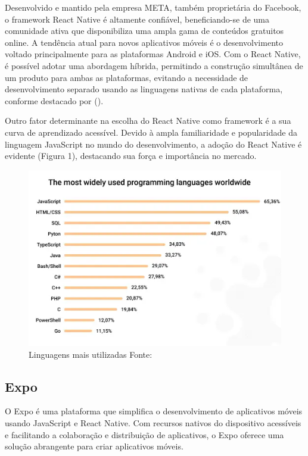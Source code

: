 Desenvolvido e mantido pela empresa META, também proprietária do Facebook, o framework React Native é altamente confiável, beneficiando-se de uma comunidade ativa 
que disponibiliza uma ampla gama de conteúdos gratuitos online. A tendência atual para novos aplicativos móveis é o desenvolvimento voltado principalmente para as 
plataformas Android e iOS. Com o React Native, é possível adotar uma abordagem híbrida, permitindo a construção simultânea de um produto para ambas as plataformas, 
evitando a necessidade de desenvolvimento separado usando as linguagens nativas de cada plataforma, conforme destacado por (\textcite{Sabino}).

Outro fator determinante na escolha do React Native como framework é a sua curva de aprendizado acessível. Devido à ampla familiaridade e popularidade da linguagem 
JavaScript no mundo do desenvolvimento, a adoção do React Native é evidente (Figura 1), destacando sua força e importância no mercado.
\begin{figure}[htb]
	\caption{\label{fig:Fig_1}Linguagens mais utilizadas Fonte: \cite{Softermii}}
	\begin{center}
		\includegraphics{images/top.png}
	\end{center}
\end{figure}

\subsection{Expo}
O Expo é uma plataforma que simplifica o desenvolvimento de aplicativos móveis usando JavaScript e React Native. Com recursos nativos do dispositivo acessíveis e facilitando a colaboração e distribuição de aplicativos, o Expo oferece uma solução abrangente para criar aplicativos móveis.

